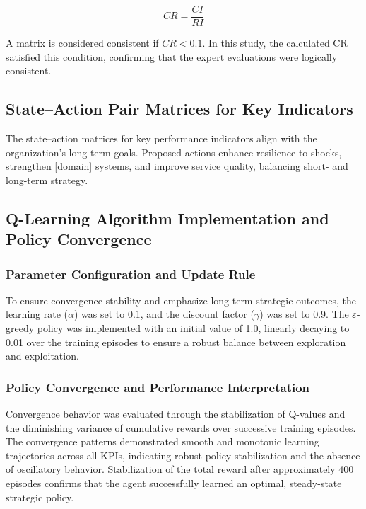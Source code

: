 \documentclass[10pt,twocolumn]{article}
\begin{document}
\begin{equation}
  CR = \frac{CI}{RI}
  \label{eq:cr}
\end{equation}

A matrix is considered consistent if $CR < 0.1$. In this study,
the calculated CR satisfied this condition, confirming that the
expert evaluations were logically consistent.

\subsection{State--Action Pair Matrices for Key Indicators}

The state--action matrices for key performance indicators align
with the organization's long-term goals. Proposed actions enhance
resilience to shocks, strengthen [domain] systems, and improve
service quality, balancing short- and long-term strategy.

\subsection{Q-Learning Algorithm Implementation and Policy
Convergence}

\subsubsection{Parameter Configuration and Update Rule}
To ensure convergence stability and emphasize long-term strategic
outcomes, the learning rate ($\alpha$) was set to 0.1, and the
discount factor ($\gamma$) was set to 0.9. The $\varepsilon$-greedy
policy was implemented with an initial value of 1.0, linearly
decaying to 0.01 over the training episodes to ensure a robust
balance between exploration and exploitation.

\subsubsection{Policy Convergence and Performance Interpretation}
Convergence behavior was evaluated through the stabilization of
Q-values and the diminishing variance of cumulative rewards over
successive training episodes. The convergence patterns demonstrated
smooth and monotonic learning trajectories across all KPIs,
indicating robust policy stabilization and the absence of
oscillatory behavior. Stabilization of the total reward after
approximately 400 episodes confirms that the agent successfully
learned an optimal, steady-state strategic policy.
\end{document}
